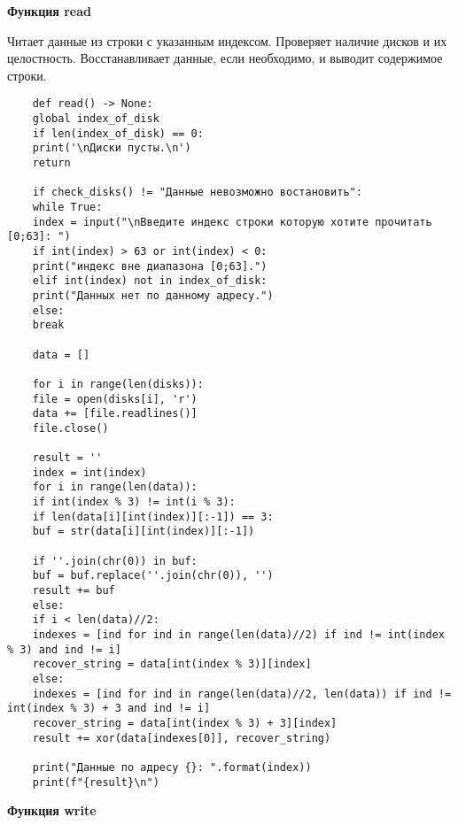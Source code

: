 \documentclass[10pt,a4paper,final]{article} %
\begin{document}
\textbf{{\large Функция read}}

Читает данные из строки с указанным индексом. Проверяет наличие дисков и их целостность. Восстанавливает данные, если необходимо, и выводит содержимое строки.
\begin{lstlisting}
	def read() -> None:
	global index_of_disk
	if len(index_of_disk) == 0:
	print('\nДиски пусты.\n')
	return
	
	if check_disks() != "Данные невозможно востановить":
	while True:
	index = input("\nВведите индекс строки которую хотите прочитать [0;63]: ")
	if int(index) > 63 or int(index) < 0:
	print("индекс вне диапазона [0;63].")
	elif int(index) not in index_of_disk:
	print("Данных нет по данному адресу.")
	else:
	break
	
	data = []
	
	for i in range(len(disks)):
	file = open(disks[i], 'r')
	data += [file.readlines()]
	file.close()
	
	result = ''
	index = int(index)
	for i in range(len(data)):
	if int(index % 3) != int(i % 3):
	if len(data[i][int(index)][:-1]) == 3:
	buf = str(data[i][int(index)][:-1])
	
	if ''.join(chr(0)) in buf:
	buf = buf.replace(''.join(chr(0)), '')
	result += buf
	else:
	if i < len(data)//2:
	indexes = [ind for ind in range(len(data)//2) if ind != int(index % 3) and ind != i]
	recover_string = data[int(index % 3)][index]
	else:
	indexes = [ind for ind in range(len(data)//2, len(data)) if ind != int(index % 3) + 3 and ind != i]
	recover_string = data[int(index % 3) + 3][index]
	result += xor(data[indexes[0]], recover_string)
	
	print("Данные по адресу {}: ".format(index))
	print(f"{result}\n")
\end{lstlisting}

\textbf{{\large Функция write}}
\end{document}

